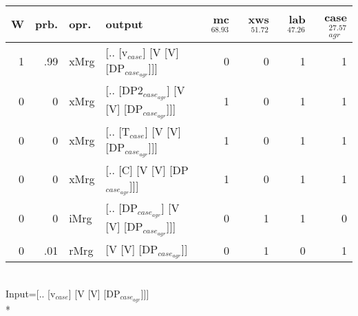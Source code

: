 \begin{tabularx}{\linewidth}{rrlXrrrr}
\hline
   W &   prb. & opr.   & output                                    &   mc$^{68.93}$ &   xws$^{51.72}$ &   lab$^{47.26}$ &   case$_{agr}^{27.57}$ \\
\hline
   1 &   .99 & xMrg & [.. [v$_{case}$] [V [V] [DP$_{case_{agr}}$]]]       &            0 &             0 &             1 &                  1 \\
   0 &   0 & xMrg & [.. [DP2$_{case_{agr}}$] [V [V] [DP$_{case_{agr}}$]]] &            1 &             0 &             1 &                  1 \\
   0 &   0 & xMrg & [.. [T$_{case}$] [V [V] [DP$_{case_{agr}}$]]]       &            1 &             0 &             1 &                  1 \\
   0 &   0 & xMrg & [.. [C] [V [V] [DP$_{case_{agr}}$]]]            &            1 &             0 &             1 &                  1 \\
   0 &   0 & iMrg & [.. [DP$_{case_{agr}}$] [V [V] [DP$_{case_{agr}}$]]]  &            0 &             1 &             1 &                  0 \\
   0 &   .01 & rMrg & [V [V] [DP$_{case_{agr}}$]]                     &            0 &             1 &             0 &                  1 \\
\hline
\end{tabularx}\endgroup\\
\begingroup\scriptsize Input=[.. [v$_{case}$] [V [V] [DP$_{case_{agr}}$]]]\\*

